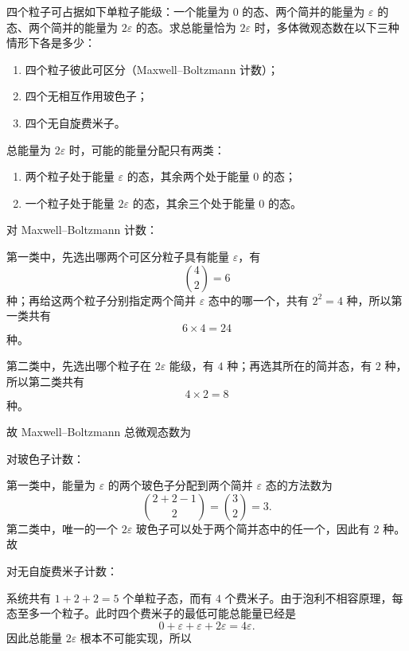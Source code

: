 \begin{question}[16分]
四个粒子可占据如下单粒子能级：一个能量为 $0$ 的态、两个简并的能量为 $\varepsilon$ 的态、两个简并的能量为 $2\varepsilon$ 的态。求总能量恰为 $2\varepsilon$ 时，多体微观态数在以下三种情形下各是多少：
\begin{enumerate}[label=（\arabic*）,leftmargin=2.8em,itemsep=0.2em]
\item 四个粒子彼此可区分（Maxwell--Boltzmann 计数）；
\item 四个无相互作用玻色子；
\item 四个无自旋费米子。
\end{enumerate}
\begin{solution}

总能量为 $2\varepsilon$ 时，可能的能量分配只有两类：

\begin{enumerate}[label=（\arabic*）,leftmargin=2.4em,itemsep=0.2em]
\item 两个粒子处于能量 $\varepsilon$ 的态，其余两个处于能量 $0$ 的态；
\item 一个粒子处于能量 $2\varepsilon$ 的态，其余三个处于能量 $0$ 的态。
\end{enumerate}

对 Maxwell--Boltzmann 计数：

第一类中，先选出哪两个可区分粒子具有能量 $\varepsilon$，有
\[
\binom{4}{2}=6
\]
种；再给这两个粒子分别指定两个简并 $\varepsilon$ 态中的哪一个，共有 $2^2=4$ 种，所以第一类共有
\[
6\times4=24
\]
种。

第二类中，先选出哪个粒子在 $2\varepsilon$ 能级，有 $4$ 种；再选其所在的简并态，有 $2$ 种，所以第二类共有
\[
4\times2=8
\]
种。

故 Maxwell--Boltzmann 总微观态数为

对玻色子计数：

第一类中，能量为 $\varepsilon$ 的两个玻色子分配到两个简并 $\varepsilon$ 态的方法数为
\[
\binom{2+2-1}{2}=\binom32=3.
\]
第二类中，唯一的一个 $2\varepsilon$ 玻色子可以处于两个简并态中的任一个，因此有 $2$ 种。故

对无自旋费米子计数：

系统共有 $1+2+2=5$ 个单粒子态，而有 $4$ 个费米子。由于泡利不相容原理，每态至多一个粒子。此时四个费米子的最低可能总能量已经是
\[
0+\varepsilon+\varepsilon+2\varepsilon=4\varepsilon.
\]
因此总能量 $2\varepsilon$ 根本不可能实现，所以
\end{solution}
\end{question}

